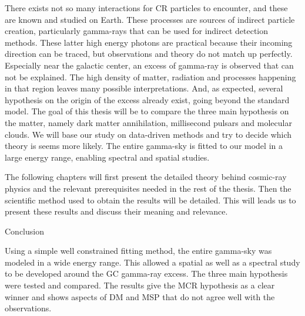 There exists not so many interactions for CR particles to encounter, and these are known and studied on Earth. These processes are sources of indirect particle creation, particularly gamma-rays that can be used for indirect detection methods. These latter high energy photons are practical because their incoming direction can be traced, but observations and theory do not match up perfectly. Especially near the galactic center, an excess of gamma-ray is observed that can not be explained. The high density of matter, radiation and processes happening in that region leaves many possible interpretations. And, as expected, several hypothesis on the origin of the excess already exist, going beyond the standard model. 
The goal of this thesis will be to compare the three main hypothesis on the matter, namely dark matter annihilation, millisecond pulsars and molecular clouds. We will base our study on data-driven methods and try to decide which theory is seems more likely. The entire gamma-sky is fitted to our model in a large energy range, enabling spectral and spatial studies.

The following chapters will first present the detailed theory behind cosmic-ray physics and the relevant prerequisites needed in the rest of the thesis. Then the scientific method used to obtain the results will be detailed. This will leads us to present these results and discuss their meaning and relevance. 


	
	
%
Conclusion
%
%
%
%

Using a simple well constrained fitting method, the entire gamma-sky was modeled in a wide energy range. This allowed a spatial as well as a spectral study to be developed around the GC gamma-ray excess. The three main hypothesis were tested and compared.
The results give the MCR hypothesis as a clear winner and shows aspects of DM and MSP that do not agree well with the observations.





